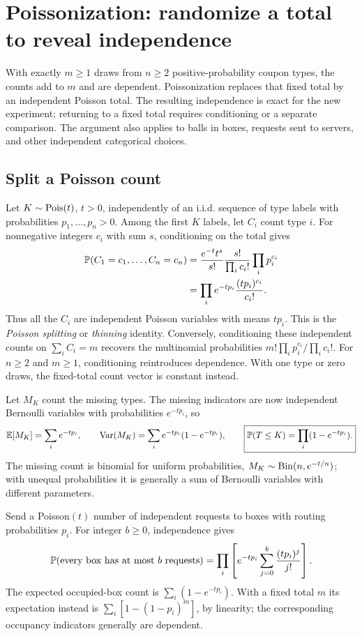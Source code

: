 \section{Poissonization: randomize a total to reveal independence}
\label{sec:poissonization}

With exactly $m\ge1$ draws from $n\ge2$ positive-probability coupon
types, the counts add to $m$ and are dependent. Poissonization replaces
that fixed total by an independent
Poisson total. The resulting independence is exact for the new experiment;
returning to a fixed total requires conditioning or a separate comparison.
The argument also applies to balls in boxes, requests sent to servers,
and other independent categorical choices.

\subsection{Split a Poisson count}

Let $K\sim\Pois(t)$, $t>0$, independently of an i.i.d. sequence of
type labels with probabilities $p_1,\ldots,p_n>0$. Among the first $K$
labels, let $C_i$ count type $i$. For nonnegative integers $c_i$ with
sum $s$, conditioning on the total gives
\begin{align*}
\P(C_1=c_1,\ldots,C_n=c_n)
&=\frac{e^{-t}t^s}{s!}\frac{s!}{\prod_i c_i!}\prod_i p_i^{c_i}\\
&=\prod_i e^{-tp_i}\frac{(tp_i)^{c_i}}{c_i!}.
\end{align*}
Thus all the $C_i$ are independent Poisson variables with means $tp_i$.
This is the \emph{Poisson splitting} or \emph{thinning} identity.
Conversely, conditioning these independent counts on $\sum_i C_i=m$
recovers the multinomial probabilities
$m!\prod_i p_i^{c_i}/\prod_i c_i!$. For $n\ge2$ and $m\ge1$,
conditioning reintroduces dependence. With one type or zero draws,
the fixed-total count vector is constant instead.

Let $M_K$ count the missing types. The missing indicators are now
independent Bernoulli variables with probabilities $e^{-tp_i}$, so
\[
\E[M_K]=\sum_i e^{-tp_i},\qquad
\Var(M_K)=\sum_i e^{-tp_i}(1-e^{-tp_i}),\qquad
\boxed{\P(T\le K)=\prod_i(1-e^{-tp_i}).}
\]
The missing count is binomial for uniform probabilities,
$M_K\sim\Bin(n,e^{-t/n})$; with unequal probabilities it is generally
a sum of Bernoulli variables with different parameters.

\begin{example}
Send a Poisson$(t)$ number of independent requests to boxes with routing
probabilities $p_i$. For integer $b\ge0$, independence gives
\[
\P(\text{every box has at most }b\text{ requests})
=\prod_i\left[e^{-tp_i}\sum_{j=0}^b\frac{(tp_i)^j}{j!}\right].
\]
The expected occupied-box count is $\sum_i(1-e^{-tp_i})$.
With a fixed total $m$ its expectation instead is
$\sum_i[1-(1-p_i)^m]$, by linearity; the corresponding occupancy
indicators generally are dependent.
\end{example}

